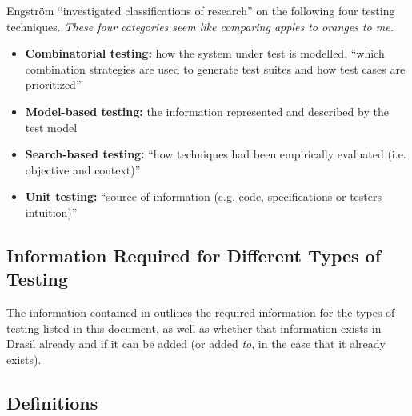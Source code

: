 Engström ``investigated classifications of research''
\citep[p.~1]{engström_mapping_2015} on the following four testing techniques.
\emph{These four categories seem like comparing apples to oranges to me.}

\begin{itemize}
      \item \textbf{Combinatorial testing:} how the system under test is
            modelled, ``which combination strategies are used to generate test
            suites and how test cases are prioritized''
            \citep[pp.~1-2]{engström_mapping_2015}
      \item \textbf{Model-based testing:} the information represented and
            described by the test model \citep[p.~2]{engström_mapping_2015}
      \item \textbf{Search-based testing:} ``how techniques had been
            empirically evaluated (i.e. objective and context)''
            \citep[p.~2]{engström_mapping_2015}
      \item \textbf{Unit testing:} ``source of information (e.g. code,
            specifications or testers intuition)''
            \citep[p.~2]{engström_mapping_2015}
\end{itemize}

\subsection{Information Required for Different Types of Testing}

The information contained in  outlines the required
information for the types of testing listed in this document, as well as
whether that information exists in Drasil already and if it can be added
(or added \emph{to}, in the case that it already exists).

\testReqsTable{}

\subsection{Definitions}


